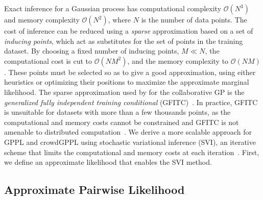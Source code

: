 Exact inference for a Gaussian process has computational complexity $\mathcal{O}(N^3)$ 
and memory complexity $\mathcal{O}(N^2)$, where $N$ is the number of data points.
The cost of inference can be reduced using a \emph{sparse} approximation based on a set of 
\emph{inducing points}, which act as substitutes for the set of points in the training dataset.
By choosing a fixed number of inducing points, $M \ll N$, the computational cost is cut to $\mathcal{O}(NM^2)$,
and the memory complexity to $\mathcal{O}(NM)$.
These points must be selected so as to give a good approximation, 
using either heuristics or optimizing their positions to maximize the approximate
marginal likelihood. 
The sparse approximation used by \citet{houlsby2012collaborative} for the collaborative GP 
is the \emph{generalized fully independent training conditional} (GFITC)~\citep{snelson2006sparse}.
In practice, GFITC is unsuitable for datasets with more than a few thousands points,
as the computational and memory costs cannot be constrained
and GFITC is not amenable to distributed computation~\citep{hensman2015scalable}.  
We derive a more scalable approach for GPPL and crowdGPPL using
stochastic variational inference (SVI), an iterative scheme that limits the computational and memory costs at
each iteration~\citep{hoffman2013stochastic}.
First, we define an approximate likelihood that enables the SVI method.

\subsection{Approximate Pairwise Likelihood}

